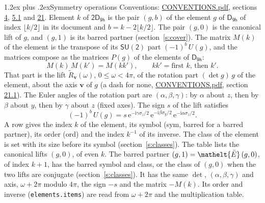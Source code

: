 \documentclass[10pt,a4paper]{article}
\makeatletter
\renewcommand\section{\@startsection{section}{1}{\z@}{-3ex plus -1ex minus -.2ex}%
  {1.2ex plus .2ex}{\normalfont\large\sffamily\bfseries\color{parttitle}}}
\numberwithin{equation}{section}
\newcommand{\eltfont}[1]{{\let\sigma\eltsigma\mathelt{#1}}}
\newcommand{\grp}[1]{\mathsf{#1}}
\newcommand{\elt}[1]{\eltfont{#1}}
\newcommand{\vv}{\mathbf{v}}
\newcommand{\iunit}{\mathrm{i}}
\newcommand{\expe}{\mathrm{e}}
\newcommand{\barred}[1]{\bar{#1}}
\newcommand{\lift}[1]{\tilde{#1}}
\newcommand{\pauli}[1]{\sigma_{#1}}
\makeatother
\begin{document}
\section{Symmetry operations}\label{s:elements}
Conventions: \href{../../CONVENTIONS.pdf}{CONVENTIONS.pdf}, sections \href{../../../rotation/CONVENTIONS.pdf\#conv.4}{4}, \href{../../../rotation/CONVENTIONS.pdf\#conv.5.1}{5.1} and \href{../../CONVENTIONS.pdf\#conv.21}{21}.
\leavevmode\label{n:index.element}\label{n:element.g}Element $k$ of $\grp{2D_{9h}}$ is the pair $(g, b)$ of the element $g$ of \href{../../../rotation/data/pdf/D9h.pdf}{$\grp{D_{9h}}$} of index $\lfloor k/2\rfloor$ in its document and $b = k - 2\lfloor k/2\rfloor$. The pair $(g, 0)$ is the canonical lift of $g$, and $(g, 1)$ is its barred partner (section~\ref{s:cover}). \label{n:matrix.element.pin}\label{n:matrix.element}The matrix $M(k)$ of the element is the transpose of its $\grp{SU(2)}$ part $(-1)^{b}\,U(g)$, and the matrices compose as the matrices $P(g)$ of the elements of $\grp{D_{9h}}$:
\begin{equation}\label{e:mprod}M(k)\,M(k') = M(kk'),\qquad kk' = \text{first } k\text{, then } k'.\end{equation}
\leavevmode\label{n:angle.omega}\label{n:vector.axis}\label{n:vector.pole}That part is the lift $\lift{R}_{\vv}(\omega)$, $0 \le \omega < 4\pi$, of the rotation part $(\det g)\,g$ of the element, about the axis $\vv$ of $g$ (a dash for none, \href{../../CONVENTIONS.pdf}{CONVENTIONS.pdf}, section \href{../../CONVENTIONS.pdf\#conv.21.1}{21.1}). \label{n:angle.euler.alpha}\label{n:angle.euler.beta}\label{n:angle.euler.gamma}\label{n:vector.coordinates}The Euler angles of the rotation part are $(\alpha,\beta,\gamma)$: by $\alpha$ about $z$, then by $\beta$ about $y$, then by $\gamma$ about $z$ (fixed axes). \label{n:local.euler.sign}The sign $s$ of the lift satisfies
\begin{equation}\label{e:euler}(-1)^{b}\,U(g) = s\,\expe^{-\iunit\gamma\pauli{z}/2}\,\expe^{-\iunit\beta\pauli{y}/2}\,\expe^{-\iunit\alpha\pauli{z}/2}.\end{equation}
\leavevmode\label{n:index.element.inverse}\label{n:head.sym}\label{n:head.ord}A row gives the index $k$ of the element, its symbol (sym, barred for a barred partner), its order (ord) and the index $k^{-1}$ of its inverse. \label{n:head.class}The class of the element is set with its size before its symbol (section~\ref{s:classes}).
The table lists the canonical lifts $(g, 0)$, of even $k$. The barred partner $(g, 1) = \elt{\barred{E}}\,(g, 0)$, of index $k + 1$, has the barred symbol and class, or the class of $(g, 0)$ when the two lifts are conjugate (section~\ref{s:classes}). It has the same $\det$, $(\alpha,\beta,\gamma)$ and axis, $\omega + 2\pi$ modulo $4\pi$, the sign $-s$ and the matrix $-M(k)$. Its order and inverse (\texttt{elements.items}) are read from $\omega + 2\pi$ and the multiplication table.
\end{document}
